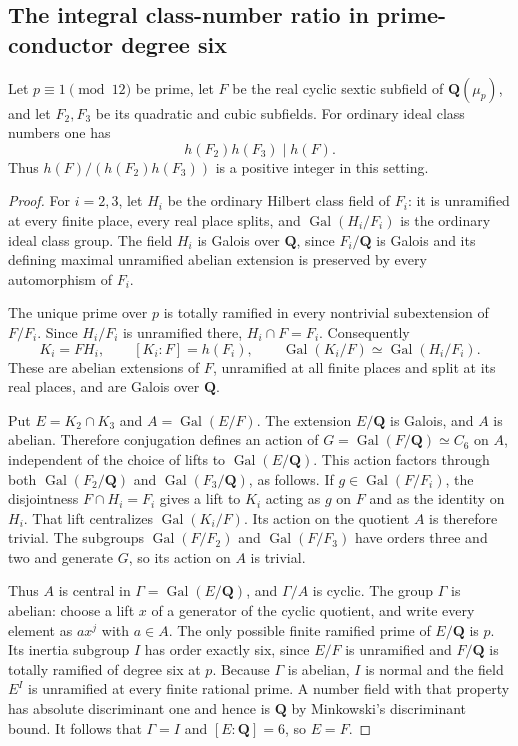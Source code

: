 \subsection{The integral class-number ratio in prime-conductor degree six}

\begin{lemma}
Let $p\equiv1\pmod{12}$ be prime, let $F$ be the real cyclic sextic
subfield of $\mathbf Q(\mu_p)$, and let $F_2,F_3$ be its quadratic
and cubic subfields.  For ordinary ideal class numbers one has
\[
                         h(F_2)h(F_3)\mid h(F).
 \tag{SC.1}
\]
Thus $h(F)/(h(F_2)h(F_3))$ is a positive integer in this setting.
\end{lemma}

\begin{proof}
For $i=2,3$, let $H_i$ be the ordinary Hilbert class field of $F_i$:
it is unramified at every finite place, every real place splits, and
$\operatorname{Gal}(H_i/F_i)$ is the ordinary ideal class group.
The field $H_i$ is Galois over $\mathbf Q$, since $F_i/\mathbf Q$ is
Galois and its defining maximal unramified abelian extension is
preserved by every automorphism of $F_i$.

The unique prime over $p$ is totally ramified in every nontrivial
subextension of $F/F_i$.  Since $H_i/F_i$ is unramified there,
$H_i\cap F=F_i$.  Consequently
\[
 K_i=FH_i,\qquad [K_i:F]=h(F_i),
 \qquad \operatorname{Gal}(K_i/F)\simeq\operatorname{Gal}(H_i/F_i).
 \tag{SC.2}
\]
These are abelian extensions of $F$, unramified at all finite places
and split at its real places, and are Galois over $\mathbf Q$.

Put $E=K_2\cap K_3$ and $A=\operatorname{Gal}(E/F)$.
The extension $E/\mathbf Q$ is Galois, and $A$ is abelian.  Therefore
conjugation defines an action of
$G=\operatorname{Gal}(F/\mathbf Q)\simeq C_6$ on $A$, independent
of the choice of lifts to $\operatorname{Gal}(E/\mathbf Q)$.
This action factors through both $\operatorname{Gal}(F_2/\mathbf Q)$
and $\operatorname{Gal}(F_3/\mathbf Q)$, as follows.
If $g\in\operatorname{Gal}(F/F_i)$, the disjointness
$F\cap H_i=F_i$ gives a lift to $K_i$ acting as $g$ on $F$ and as
the identity on $H_i$.  That lift centralizes
$\operatorname{Gal}(K_i/F)$.  Its action on the quotient $A$ is
therefore trivial.  The subgroups $\operatorname{Gal}(F/F_2)$ and
$\operatorname{Gal}(F/F_3)$ have orders three and two and generate
$G$, so its action on $A$ is trivial.

Thus $A$ is central in $\Gamma=\operatorname{Gal}(E/\mathbf Q)$,
and $\Gamma/A$ is cyclic.  The group $\Gamma$ is abelian: choose
a lift $x$ of a generator of the cyclic quotient, and write every
element as $ax^j$ with $a\in A$.
The only possible finite ramified prime of $E/\mathbf Q$ is $p$.
Its inertia subgroup $I$ has order exactly six, since $E/F$ is
unramified and $F/\mathbf Q$ is totally ramified of degree six at $p$.
Because $\Gamma$ is abelian, $I$ is normal and the field $E^I$ is
unramified at every finite rational prime.  A number field with that
property has absolute discriminant one and hence is $\mathbf Q$
by Minkowski's discriminant bound.  It follows that $\Gamma=I$ and
$[E:\mathbf Q]=6$, so $E=F$.


\end{proof}
